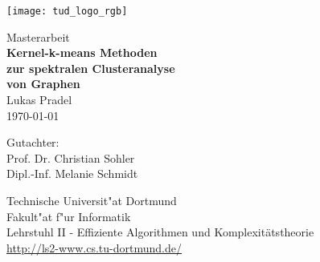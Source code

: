 \begin{titlepage}
\pagestyle{empty}
\vspace*{-2cm}
\newlength{\links}
\setlength{\links}{-1.5cm}
\rmfamily
\hspace*{\links}
\begin{minipage}{12.5cm}
\texttt{[image: tud\_logo\_rgb]}
\end{minipage}

\vspace*{4cm}

\hspace*{\links}
\hspace*{-0.2cm}
\begin{minipage}{9cm}
\large
\begin{center}
{\Large Masterarbeit} \\
\vspace*{1cm}
\textbf{Kernel-k-means Methoden\\zur spektralen Clusteranalyse\\von Graphen} \\
\vspace*{1cm}
Lukas Pradel\\
\today
\end{center}
\end{minipage}
\normalsize
\vspace*{4.8cm}


\vspace*{2.1cm}

\hspace*{\links}
\begin{minipage}[b]{5cm}
\raggedright
Gutachter: \\
Prof. Dr. Christian Sohler \\
Dipl.-Inf. Melanie Schmidt \\
\end{minipage}

\vspace*{2.5cm}
\hspace*{\links}
\begin{minipage}[b]{11cm}
\raggedright
Technische Universit"at Dortmund \\
Fakult"at f"ur Informatik\\
Lehrstuhl II - Effiziente Algorithmen und Komplexitätstheorie\\
\href{http://ls2-www.cs.tu-dortmund.de/}{http://ls2-www.cs.tu-dortmund.de/}
\end{minipage}
\end{titlepage}
\restoregeometry